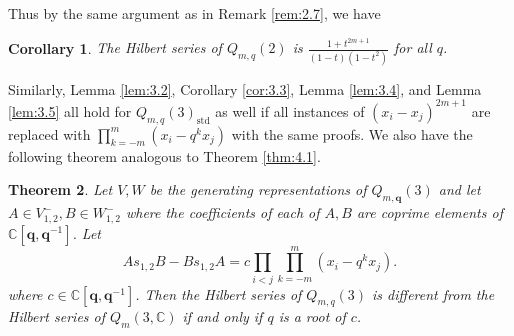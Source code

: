 \documentclass[11pt]{article}
\newtheorem{theorem}{Theorem}[section]
\newtheorem{corollary}[theorem]{Corollary}
\theoremstyle{definition}
\newcommand{\std}{\mathrm{std}}
\newcommand{\C}{\mathbb{C}}
\renewcommand{\b}[1]{\textbf{#1}}
\begin{document}
Thus by the same argument as in Remark \ref{rem:2.7}, we have

\begin{corollary}
    The Hilbert series of $Q_{m,q}(2)$ is $\frac{1+t^{2m+1}}{(1-t)(1-t^2)}$ for all $q$.
\end{corollary}

Similarly, Lemma \ref{lem:3.2}, Corollary \ref{cor:3.3}, Lemma \ref{lem:3.4}, and Lemma \ref{lem:3.5} all hold for $Q_{m,q}(3)_\std$ as well if all instances of $(x_i-x_j)^{2m+1}$ are replaced with $\prod_{k=-m}^m(x_i-q^kx_j)$ with the same proofs. We also have the following theorem analogous to Theorem \ref{thm:4.1}.

\begin{theorem}
    Let $V,W$ be the generating representations of $Q_{m,\b{q}}(3)$ and let $A\in V_{1,2}^-,B\in W_{1,2}^-$ where the coefficients of each of $A,B$ are coprime elements of $\C[\b{q},\b{q}^{-1}]$. Let 
    $$As_{1,2}B-Bs_{1,2}A=c\prod_{i<j}\prod_{k=-m}^m(x_i-q^kx_j).$$
    where $c\in\C[\b{q},\b{q}^{-1}]$. Then the Hilbert series of $Q_{m,q}(3)$ is different from the Hilbert series of $Q_m(3,\C)$ if and only if $q$ is a root of $c$.
\end{theorem}
\end{document}
